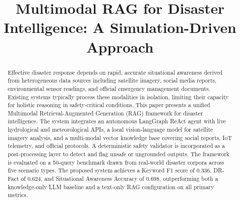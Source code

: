 \documentclass[conference]{IEEEtran}
\begin{document}
\title{Multimodal RAG for Disaster Intelligence: A Simulation-Driven Approach}

\author{
}

\maketitle

\begin{abstract}
Effective disaster response depends on rapid, accurate situational awareness
derived from heterogeneous data sources including satellite imagery, social
media reports, environmental sensor readings, and official emergency
management documents. Existing systems typically process these modalities in
isolation, limiting their capacity for holistic reasoning in safety-critical
conditions. This paper presents a unified Multimodal Retrieval-Augmented
Generation (RAG) framework for disaster intelligence. The system integrates
an autonomous LangGraph ReAct agent with live hydrological and meteorological
APIs, a local vision-language model for satellite imagery analysis, and a
multi-modal vector knowledge base covering social reports, IoT telemetry, and
official protocols. A deterministic safety validator is incorporated as a
post-processing layer to detect and flag unsafe or ungrounded outputs. The
framework is evaluated on a 50-query benchmark drawn from real-world disaster
corpora across five scenario types. The proposed system achieves a Keyword F1
score of 0.336, DR-Fact of 0.624, and Situational Awareness Accuracy of 0.698,
outperforming both a knowledge-only LLM baseline and a text-only RAG
configuration on all primary metrics.
\end{abstract}
\end{document}
